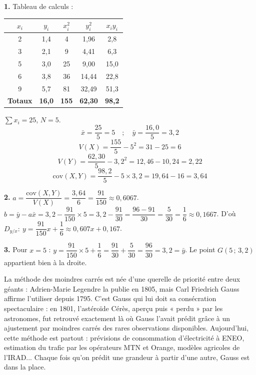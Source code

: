 \documentclass[11pt]{article}
\begin{document}
\begin{corrige}
\textbf{1.} Tableau de calculs :
\begin{center}
\begin{tabular}{|c|c|c|c|c|}
\hline
\rowcolor{popblueL} $x_i$ & $y_i$ & $x_i^2$ & $y_i^2$ & $x_i y_i$ \\
\hline
2 & 1,4 & 4 & 1,96 & 2,8 \\
3 & 2,1 & 9 & 4,41 & 6,3 \\
5 & 3,0 & 25 & 9,00 & 15,0 \\
6 & 3,8 & 36 & 14,44 & 22,8 \\
9 & 5,7 & 81 & 32,49 & 51,3 \\
\hline
\rowcolor{popcream} \textbf{Totaux} & \textbf{16,0} & \textbf{155} & \textbf{62,30} & \textbf{98,2} \\
\hline
\end{tabular}
\end{center}
$\sum x_i = 25$, $N=5$.
\[
\bar{x}=\frac{25}{5}=5 \quad ; \quad \bar{y}=\frac{16,0}{5}=3{,}2
\]
\[
V(X)=\frac{155}{5}-5^2=31-25=6
\]
\[
V(Y)=\frac{62,30}{5}-3,2^2=12,46-10,24=2,22
\]
\[
\mathrm{cov}(X,Y)=\frac{98,2}{5}-5\times 3,2=19,64-16=3,64
\]

\textbf{2.} $a=\dfrac{\mathrm{cov}(X,Y)}{V(X)}=\dfrac{3,64}{6}=\dfrac{91}{150}\approx 0{,}6067$.
$b=\bar{y}-a\bar{x}=3,2-\dfrac{91}{150}\times 5=3,2-\dfrac{91}{30}=\dfrac{96-91}{30}=\dfrac{5}{30}=\dfrac{1}{6}\approx 0{,}1667$.
D'où $D_{y/x}:\ y=\dfrac{91}{150}x+\dfrac{1}{6}\approx 0{,}607x+0{,}167$.

\textbf{3.} Pour $x=5$ : $y=\dfrac{91}{150}\times 5+\dfrac{1}{6}=\dfrac{91}{30}+\dfrac{5}{30}=\dfrac{96}{30}=3{,}2=\bar{y}$. Le point $G(5\,;\,3{,}2)$ appartient bien à la droite.
\end{corrige}

\begin{savaistu}
La méthode des moindres carrés est née d'une querelle de priorité entre deux géants : Adrien-Marie Legendre la publie en 1805, mais Carl Friedrich Gauss affirme l'utiliser depuis 1795. C'est Gauss qui lui doit sa consécration spectaculaire : en 1801, l'astéroïde Cérès, aperçu puis « perdu » par les astronomes, fut retrouvé exactement là où Gauss l'avait prédit grâce à un ajustement par moindres carrés des rares observations disponibles. Aujourd'hui, cette méthode est partout : prévisions de consommation d'électricité à ENEO, estimation du trafic par les opérateurs MTN et Orange, modèles agricoles de l'IRAD... Chaque fois qu'on prédit une grandeur à partir d'une autre, Gauss est dans la place.
\end{savaistu}
\end{document}
